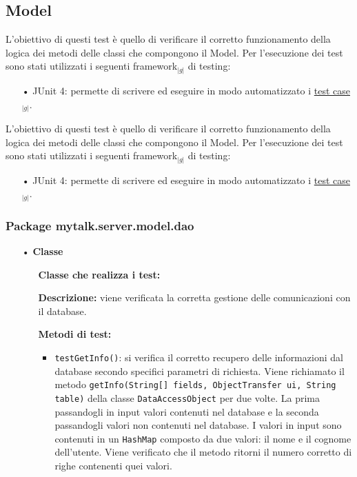 \subsection{Model}{
	L'obiettivo di questi test è quello di verificare il corretto funzionamento della logica dei metodi delle classi che compongono il Model. Per l’esecuzione dei test sono stati utilizzati i seguenti framework$_{|g|}$ di testing:
	\begin{itemize}
		\item[•] JUnit 4: permette di scrivere ed eseguire in modo automatizzato i \underline{test case}$_{|g|}$.
	\end{itemize}
		
		L'obiettivo di questi test è quello di verificare il corretto funzionamento della logica dei metodi delle classi che compongono il Model. Per l’esecuzione dei test sono stati utilizzati i seguenti framework$_{|g|}$ di testing:
	\begin{itemize}
		\item[•] JUnit 4: permette di scrivere ed eseguire in modo automatizzato i \underline{test case}$_{|g|}$.
	\end{itemize}
		
		\subsubsection{Package mytalk.server.model.dao}{
			
			\begin{itemize}
				\item[•]\textbf{Classe } 
				\begin{itemize}
					\item[] \textbf{Classe che realizza i test:} \\ 

					\item[] \textbf{Descrizione:} viene verificata la corretta gestione delle comunicazioni con il database.

					\item[] \textbf{Metodi di test:}
					\begin{itemize}
						\item \texttt{testGetInfo()}: si verifica il corretto recupero delle informazioni dal database secondo specifici parametri di richiesta. Viene richiamato il metodo \texttt{getInfo(String[] fields, ObjectTransfer ui, String table)} della classe \texttt{DataAccessObject} per due volte. La prima passandogli in input valori contenuti nel database e la seconda passandogli valori non contenuti nel database. I valori in input sono contenuti in un \texttt{HashMap} composto da due valori: il nome e il cognome dell'utente. Viene verificato che il metodo ritorni il numero corretto di righe contenenti quei valori.
						

\end{itemize}
\end{itemize}
\end{itemize}}}
